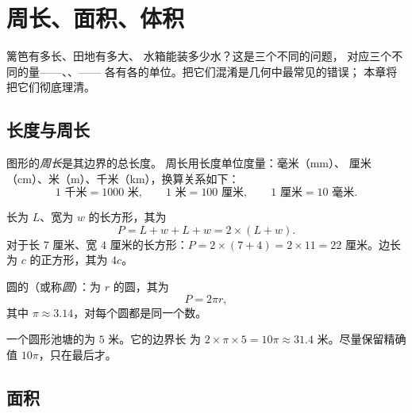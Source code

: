 \chapter{周长、面积、体积}\label{ch:g6:measure}

篱笆有多长、田地有多大、
水箱能装多少水？这是三个不同的问题，
对应三个不同的量——、、——
各有各的单位。把它们混淆是几何中最常见的错误；
本章将把它们彻底理清。

\section{长度与周长}

\begin{definition}[周长]\label{def:g6:measure:perimeter}
图形的\emph{周长}是其边界的总长度。
周长用长度单位度量：毫米（mm）、
厘米（cm）、米（m）、千米（km），换算关系如下：
\[
1 \text{ 千米} = 1000 \text{ 米}, \qquad
1 \text{ 米} = 100 \text{ 厘米}, \qquad
1 \text{ 厘米} = 10 \text{ 毫米}.
\]
\end{definition}

\begin{example}\label{ex:g6:measure:perimeter}
长为 $L$、宽为 $w$ 的长方形，其为
\[
P = L + w + L + w = 2 \times (L + w).
\]
对于长 $7$ 厘米、宽 $4$ 厘米的长方形：$P = 2 \times (7 + 4) = 2 \times 11 =
22$ 厘米。边长为 $c$ 的正方形，其为 $4c$。
\end{example}

\begin{proposition}[圆的周长]\label{prop:g6:measure:circle}
圆的（或称\emph{圆}）：为 $r$ 的圆，其为
\[
P = 2 \pi r ,
\]
其中 $\pi \approx 3.14$，对每个圆都是同一个数。
\end{proposition}
\admitted

\begin{example}
一个圆形池塘的为 $5$ 米。它的边界长
为 $2 \times \pi \times 5 = 10\pi \approx 31.4$ 米。尽量保留精确值
$10\pi$，只在最后才。
\end{example}

\section{面积}

